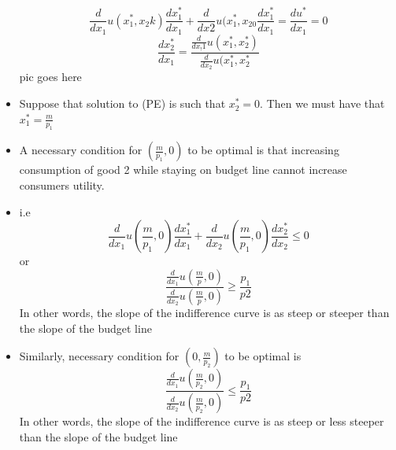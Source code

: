 \documentclass[twoside]{article}
\begin{document}
\begin{itemize}
\[\frac{d}{dx_1} u(x_1^*, x_2k) \frac{dx_1^*}{dx_1} + \frac{d}{dx2} u(x_1^*, x_20  \frac{dx_1^*}{dx_1} =\frac{du^*}{dx_1} = 0  \]
\[\frac{dx_2^*}{dx_1} = \frac{\frac{d}{dx_!1}u(x_1^*, x_2^*)}{\frac{d}{dx_2} u(x_1^*, x_2^*}\] pic goes here
\item Suppose that solution to (PE) is such that \(x_2^* = 0\). Then we must have that \(x_1^* = \frac{m}{p_1}\)
\item A necessary condition for \((\frac{m}{p_1}, 0)\) to be optimal is that increasing consumption of good 2 while staying on budget line cannot increase consumers utility. 
\item i.e 
\[\frac{d}{dx_1} u(\frac{m}{p_1}, 0) \frac{dx_1^*}{dx_1} + \frac{d}{dx_2} u(\frac{m}{p_1}, 0) \frac{dx_2^*}{dx_2} \leq 0 \]
or 
\[\frac{\frac{d}{dx_1}u(\frac{m}{p}, 0)}{\frac{d}{dx_2} u(\frac{m}{p},0)} \geq \frac{p_1}{p2}\]
In other words, the slope of the indifference curve is as steep or steeper than the slope of the budget line
\item Similarly, necessary condition for \((0, \frac{m}{p_2} )\) to be optimal is 
\[\frac{\frac{d}{dx_1}u(\frac{m}{p_2}, 0)}{\frac{d}{dx_2} u(\frac{m}{p_2},0)} \leq \frac{p_1}{p2}\]
In other words, the slope of the indifference curve is as steep or less steeper than the slope of the budget line
\end{itemize}
\end{document}
